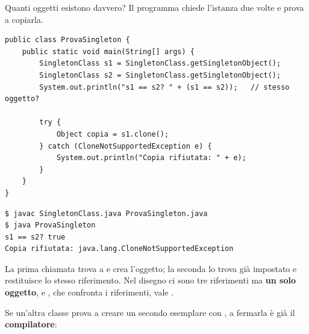 \begin{esempio}{Quanti oggetti esistono davvero?}
Il programma chiede l'istanza due volte e prova a copiarla.
\begin{lstlisting}[style=java, name=ProvaSingleton.java]
public class ProvaSingleton {
    public static void main(String[] args) {
        SingletonClass s1 = SingletonClass.getSingletonObject();
        SingletonClass s2 = SingletonClass.getSingletonObject();
        System.out.println("s1 == s2? " + (s1 == s2));   // stesso oggetto?

        try {
            Object copia = s1.clone();
        } catch (CloneNotSupportedException e) {
            System.out.println("Copia rifiutata: " + e);
        }
    }
}
\end{lstlisting}
\noindent\begin{minipage}[c]{0.48\textwidth}
\begin{lstlisting}[style=shell, name=Terminale]
$ javac SingletonClass.java ProvaSingleton.java
$ java ProvaSingleton
s1 == s2? true
Copia rifiutata: java.lang.CloneNotSupportedException
\end{lstlisting}
\end{minipage}\hfill
\begin{minipage}[c]{0.48\textwidth}
\centering
{}
\end{minipage}

\medskip
La prima chiamata trova  a  e crea l'oggetto; la seconda lo trova già impostato e restituisce
lo stesso riferimento. Nel disegno ci sono tre riferimenti ma \textbf{un solo oggetto}, e , che confronta i
riferimenti, vale .
\end{esempio}

Se un'altra classe prova a creare un secondo esemplare con , a fermarla è già il \textbf{compilatore}:

